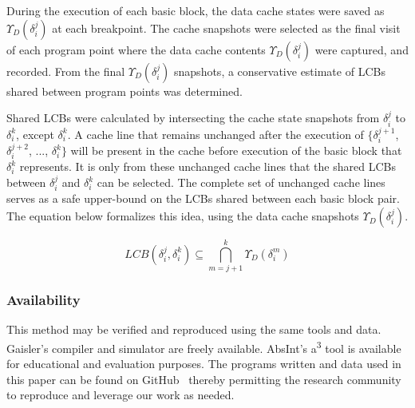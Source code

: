 During the execution of each basic block, the data cache states were saved as ${\Upsilon_D(\delta_i^j)}$ at each breakpoint.
The cache snapshots were selected as the final visit of each program point where the data cache contents ${\Upsilon_D(\delta_i^j)}$ were captured, and recorded. From the final ${\Upsilon_D(\delta_i^j)}$ snapshots, a conservative estimate of LCBs shared between program points was determined.
%

Shared LCBs were calculated by intersecting the cache state snapshots from ${\delta_i^j}$
to ${\delta_i^k}$, except ${\delta_i^k}$. A cache line that remains unchanged after
the execution of $\{{\delta_i^{j+1}}$, ${\delta_i^{j+2}}$, ..., ${\delta_i^{k}}\}$ will be present in the cache before execution of the basic block that ${\delta_i^k}$ represents. It is only from these unchanged cache lines that the shared LCBs between ${\delta_i^j}$ and ${\delta_i^k}$ can be selected. The complete set of
unchanged cache lines serves as a safe upper-bound on the LCBs shared between each basic block pair. The equation below formalizes this idea, using the data cache snapshots ${\Upsilon_D(\delta_i^j)}$.
\vspace{-20pt}
\begin{center}
  \begin{equation}
    LCB(\delta_i^j,\delta_i^k) \subseteq \bigcap_{m=j+1}^{k} {\Upsilon_D(\delta_i^m)}
  \end{equation}
\end{center}
\subsubsection{Availability}
This method may be verified and reproduced using the same tools and data. Gaisler's compiler and simulator are freely available. AbsInt's a\textsuperscript{3} tool is available for educational and evaluation purposes. The programs written and data used in this paper can be found on GitHub~\cite{tessler:14} thereby permitting the research community to reproduce and leverage our work as needed.
\newline
